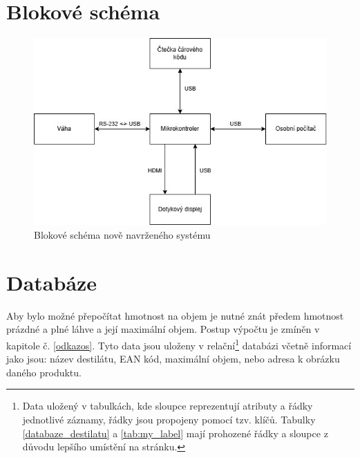 \section{Blokové schéma}
\begin{figure}[!h]
    \begin{center}
        \includegraphics[scale=0.7]{obrazky/Blokové schéma.jpg}
    \end{center}
    \caption{Blokové schéma nově navrženého systému}
    \label{blokove_schema}
\end{figure}

\section{Databáze}
\label{databaze}
Aby bylo možné přepočítat hmotnost na objem je nutné znát předem hmotnost prázdné a plné láhve a její maximální objem. Postup výpočtu je zmíněn v kapitole č. \ref{odkazos}. Tyto data jsou uloženy v relační\footnote{Data uložený v tabulkách, kde sloupce reprezentují atributy a řádky jednotlivé záznamy, řádky jsou propojeny pomocí tzv. klíčů. Tabulky \ref{databaze_destilatu} a \ref{tab:my_label} mají prohozené řádky a sloupce z důvodu lepšího umístění na stránku.} databázi včetně informací jako jsou: název destilátu, EAN kód, maximální objem, nebo adresa k obrázku daného produktu.



